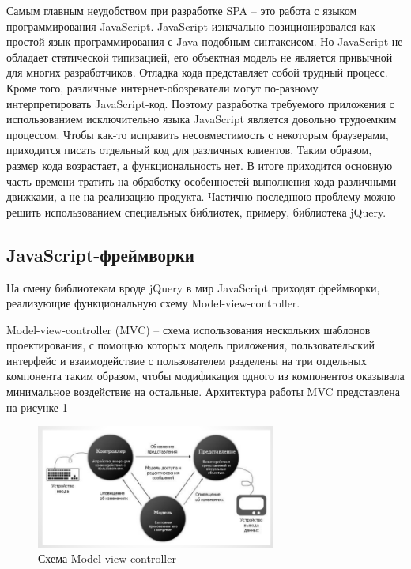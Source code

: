 Самым главным неудобством при разработке SPA -- это работа с языком программирования JavaScript. JavaScript изначально позиционировался как простой язык программирования с Java-подобным синтаксисом. Но  JavaScript не обладает статической типизацией, его объектная модель не является привычной для многих разработчиков. Отладка кода представляет собой трудный процесс. Кроме того, различные интернет-обозреватели могут по-разному интерпретировать JavaScript-код. Поэтому разработка требуемого приложения с использованием исключительно языка JavaScript является довольно трудоемким процессом. Чтобы как-то исправить несовместимость с некоторым браузерами, приходится писать отдельный код для различных клиентов. Таким образом, размер кода возрастает, а функциональность нет. В итоге приходится основную часть времени тратить на обработку особенностей выполнения кода различными движками, а не на реализацию продукта. Частично последнюю проблему можно решить использованием специальных библиотек, примеру, библиотека jQuery.  


\subsection {JavaScript-фреймворки}

На смену библиотекам вроде jQuery в мир JavaScript приходят фреймворки, реализующие функциональную схему Model-view-controller. 

Model-view-controller (MVC) -- схема использования нескольких шаблонов проектирования, с помощью которых модель приложения, пользовательский интерфейс и взаимодействие с пользователем разделены на три отдельных компонента таким образом, чтобы модификация одного из компонентов оказывала минимальное воздействие на остальные. Архитектура работы MVC представлена на рисунке \ref{mvc}

\begin{figure}[ht]

\center\includegraphics[width=0.7\textwidth]{mvc}

\caption{Схема Model-view-controller}\label{mvc}

\end{figure}

